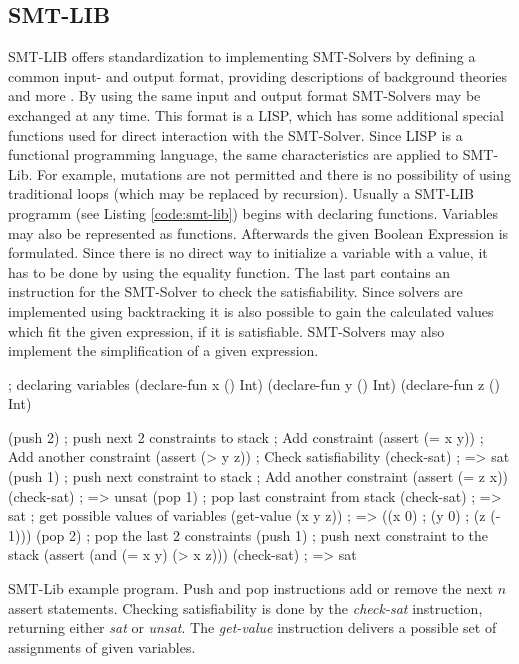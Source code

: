\subsection{SMT-LIB}
SMT-LIB offers standardization to implementing SMT-Solvers by defining a common input- and output format, providing descriptions of background theories and more \cite{cokSMTLIBv2LanguageTools}. %
By using the same input and output format SMT-Solvers may be exchanged at any time. 
This format is a LISP, which has some additional special functions used for direct interaction with the SMT-Solver. Since LISP is a functional programming language, the same characteristics are applied to SMT-Lib.
For example, mutations are not permitted and there is no possibility of using traditional loops (which may be replaced by recursion).
Usually a SMT-LIB programm (see Listing \ref{code:smt-lib}) begins with declaring functions. Variables may also be represented as functions. 
Afterwards the given Boolean Expression is formulated. Since there is no direct way to initialize a variable with a value, it has to be done by using the equality function. 
The last part contains an instruction for the SMT-Solver to check the satisfiability. 
Since solvers are implemented using backtracking it is also possible to gain the calculated values which fit the given expression, if it is satisfiable. 
SMT-Solvers may also implement the simplification of a given expression.

\begin{program}
	\begin{LispCode}
		; declaring variables
		(declare-fun x () Int)
		(declare-fun y () Int)
		(declare-fun z () Int)
		
		(push 2) ; push next 2 constraints to stack
		; Add constraint
		(assert (= x y))
		; Add another constraint
		(assert (> y z))
		; Check satisfiability
		(check-sat)
		; => sat
		(push 1) ; push next constraint to stack
		; Add another constraint
		(assert (= z x))
		(check-sat)
		; => unsat
		(pop 1) ; pop last constraint from stack
		(check-sat)
		; => sat
		; get possible values of variables
		(get-value (x y z))
		; => ((x 0)
		;     (y 0)
		;     (z (- 1)))
		(pop 2) ; pop the last 2 constraints
		(push 1) ; push next constraint to the stack
		(assert (and (= x y) (> x z)))
		(check-sat)
		; => sat\end{LispCode}
	\caption{SMT-Lib example program. Push and pop instructions add or remove the next $n$ assert statements. Checking satisfiability is done by the \emph{check-sat} instruction, returning either \emph{sat} or \emph{unsat}. The \emph{get-value} instruction delivers a possible set of assignments of given variables. }
	\label{code:smt-lib}
\end{program}



